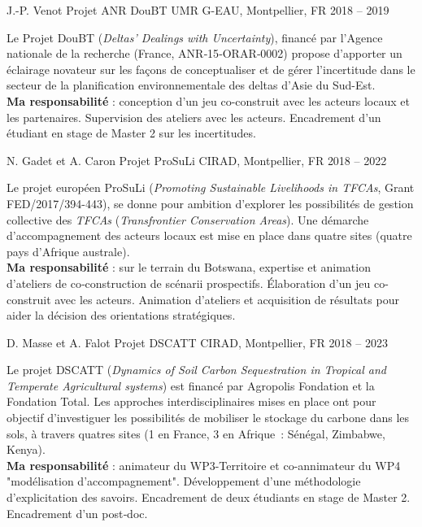 \begin{cventries}
  \cventry
  {J.-P. Venot} %
  {Projet ANR DouBT} %
  {UMR G-EAU, Montpellier, FR} %
  {2018 -- 2019} %
  {
    \begin{cvitems} %
      Le Projet DouBT (\emph{Deltas' Dealings with Uncertainty}), financé par l'Agence nationale de la recherche (France, ANR‑15‑ORAR‑0002) propose d'apporter un éclairage novateur sur les façons de conceptualiser et de gérer l'incertitude dans le secteur de la planification environnementale des deltas d'Asie du Sud-Est.\\
      \textbf{Ma responsabilité} : conception d'un jeu co-construit avec les acteurs locaux et les partenaires.  Supervision des ateliers avec les acteurs. Encadrement d’un étudiant en stage de Master 2 sur les incertitudes.
    \end{cvitems}
  }

  \cventry
  {N. Gadet et A. Caron} %
  {Projet ProSuLi} %
  {CIRAD, Montpellier, FR} %
  {2018 -- 2022} %
  {
    \begin{cvitems} %
      Le projet européen ProSuLi (\emph{Promoting Sustainable Livelihoods in TFCAs}, Grant FED/2017/394-443), se donne pour ambition d'explorer les possibilités de gestion collective des \emph{TFCAs} (\emph{Transfrontier Conservation Areas}). Une démarche d’accompagnement des acteurs locaux est mise en place dans quatre sites (quatre pays d’Afrique australe).\\
      \textbf{Ma responsabilité} : sur le terrain du Botswana, expertise et animation d’ateliers de co‑construction de scénarii prospectifs. Élaboration d'un jeu co-construit avec les acteurs. Animation d'ateliers et acquisition de résultats pour aider la décision des orientations stratégiques.
    \end{cvitems}
  }

  \cventry
  {D. Masse et A. Falot} %
  {Projet DSCATT} %
  {CIRAD, Montpellier, FR} %
  {2018 -- 2023} %
  {
    \begin{cvitems} %
        Le projet DSCATT (\emph{Dynamics of Soil Carbon Sequestration in Tropical and Temperate Agricultural systems}) est financé par Agropolis Fondation et la Fondation Total. Les approches interdisciplinaires mises en place ont pour objectif d’investiguer les possibilités de mobiliser le stockage du carbone dans les sols, à travers quatres sites (1 en France, 3 en Afrique : Sénégal, Zimbabwe, Kenya).\\
        \textbf{Ma responsabilité} : animateur du WP3-Territoire et co-annimateur du WP4 "modélisation d'accompagnement". Développement d’une méthodologie d’explicitation des savoirs. Encadrement de deux étudiants en stage de Master 2. Encadrement d’un post‑doc.
    \end{cvitems}
  }


\end{cventries}
